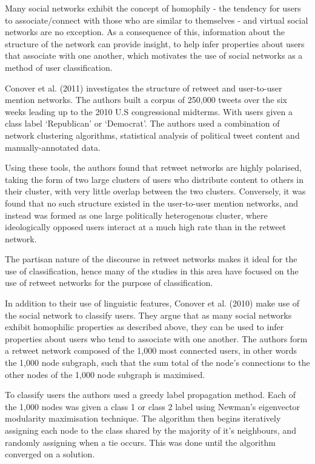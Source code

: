 \documentclass[bsc,frontabs,singlespacing,parskip]{infthesis}     %
\begin{document}
Many social networks exhibit the concept of homophily - the tendency for users to associate/connect with those who are similar to themselves - and virtual social networks are no exception. As a consequence of this, information about the structure of the network can provide insight, to help infer properties about users that associate with one another, which motivates the use of social networks as a method of user classification.

Conover et al. (2011) \cite{politicalpolarisation} investigates the structure of retweet and user-to-user mention networks. The authors built a corpus of 250,000 tweets over the six weeks leading up to the 2010 U.S congressional midterms. With users given a class label `Republican' or `Democrat'. The authors used a combination of network clustering algorithms, statistical analysis of political tweet content and manually-annotated data. 

Using these tools, the authors found that retweet networks are highly polarised, taking the form of two large clusters of users who distribute content to others in their cluster, with very little overlap between the two clusters. Conversely, it was found that no such structure existed in the user-to-user mention networks, and instead was formed as one large politically heterogenous cluster, where ideologically opposed users interact at a much high rate than in the retweet network. 

The partisan nature of the discourse in retweet networks makes it ideal for the use of classification, hence many of the studies in this area have focused on the use of retweet networks for the purpose of classification.

In addition to their use of linguistic features, Conover et al. (2010) \cite{Conover2010predicting} make use of the social network to classify users. They argue that as many social networks exhibit homophilic properties as described above, they can be used to infer properties about users who tend to associate with one another. The authors form a retweet network composed of the 1,000 most connected users, in other words the 1,000 node subgraph, such that the sum total of the node's connections to the other nodes of the 1,000 node subgraph is maximised.

To classify users the authors used a greedy label propagation method. Each of the 1,000 nodes was given a class 1 or class 2  label using Newman's eigenvector modularity maximisation technique. The algorithm then begins iteratively assigning each node to the class shared by the majority of it's neighbours, and randomly assigning when a tie occurs. This was done until the algorithm converged on a solution. 
\end{document}
